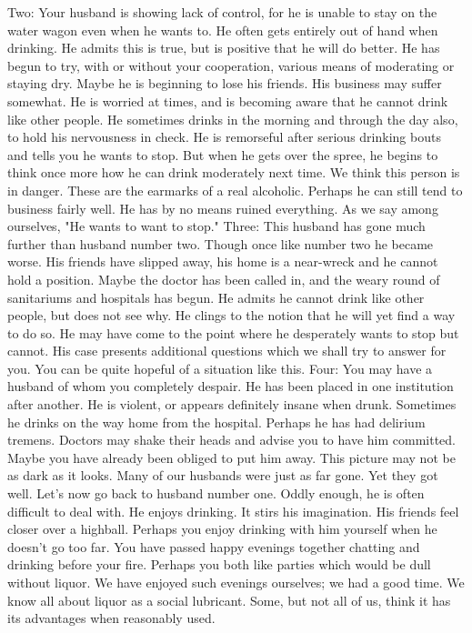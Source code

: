 \begin{biblechapter}
Two:  Your husband is showing lack of control, for he is unable to stay on the water wagon even when he wants to.  He often gets entirely out of hand when drinking.  He admits this is true, but is positive that he will do better.  He has begun to try, with or without your cooperation, various means of moderating or staying dry.  Maybe he is beginning to lose his friends.  His business may suffer somewhat.  He is worried at times, and is becoming aware that he cannot drink like other people.  He sometimes drinks in the morning and through the day also, to hold his nervousness in check.  He is remorseful after serious drinking bouts and tells you he wants to stop.  But when he gets over the spree, he begins to think once more how he can drink moderately next time.  We think this person is in danger.  These are the earmarks of a real alcoholic.  Perhaps he can still tend to business fairly well.  He has by no means ruined everything.  As we say among ourselves, "He wants to want to stop."
Three:  This husband has gone much further than husband number two.  Though once like number two he became worse.  His friends have slipped away, his home is a near-wreck and he cannot hold a position.  Maybe the doctor has been called in, and the weary round of sanitariums and hospitals has begun.  He admits he cannot drink like other people, but does not see why.  He clings to the notion that he will yet find a way to do so.  He may have come to the point where he desperately wants to stop but cannot.  His case presents additional questions which we shall try to answer for you.  You can be quite hopeful of a situation like this.
Four:  You may have a husband of whom you completely despair.  He has been placed in one institution after another.  He is violent, or appears definitely insane when drunk.  Sometimes he drinks on the way home from the hospital.  Perhaps he has had delirium tremens.  Doctors may shake their heads and advise you to have him committed.  Maybe you have already been obliged to put him away.  This picture may not be as dark as it looks.  Many of our husbands were just as far gone.  Yet they got well.
Let's now go back to husband number one.  Oddly enough, he is often difficult to deal with.  He enjoys drinking.  It stirs his imagination.  His friends feel closer over a highball.  Perhaps you enjoy drinking with him yourself when he doesn't go too far.  You have passed happy evenings together chatting and drinking before your fire.  Perhaps you both like parties which would be dull without liquor.  We have enjoyed such evenings ourselves; we had a good time.  We know all about liquor as a social lubricant.  Some, but not all of us, think it has its advantages when reasonably used.

\end{biblechapter}
